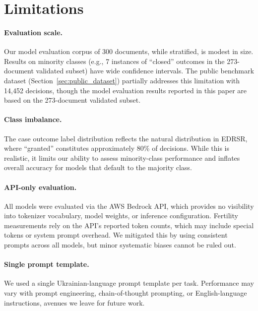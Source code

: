 \documentclass[11pt,a4paper]{article}
\begin{document}
\section{Limitations}

\paragraph{Evaluation scale.} Our model evaluation corpus of 300 documents, while stratified, is modest in size. Results on minority classes (e.g., 7 instances of ``closed'' outcomes in the 273-document validated subset) have wide confidence intervals. The public benchmark dataset (Section~\ref{sec:public_dataset}) partially addresses this limitation with 14,452 decisions, though the model evaluation results reported in this paper are based on the 273-document validated subset.

\paragraph{Class imbalance.} The case outcome label distribution reflects the natural distribution in EDRSR, where ``granted'' constitutes approximately 80\% of decisions. While this is realistic, it limits our ability to assess minority-class performance and inflates overall accuracy for models that default to the majority class.

\paragraph{API-only evaluation.} All models were evaluated via the AWS Bedrock API, which provides no visibility into tokenizer vocabulary, model weights, or inference configuration. Fertility measurements rely on the API's reported token counts, which may include special tokens or system prompt overhead. We mitigated this by using consistent prompts across all models, but minor systematic biases cannot be ruled out.

\paragraph{Single prompt template.} We used a single Ukrainian-language prompt template per task. Performance may vary with prompt engineering, chain-of-thought prompting, or English-language instructions, avenues we leave for future work.
\end{document}
